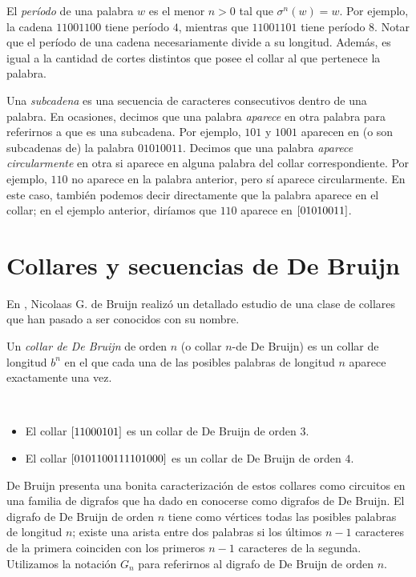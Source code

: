 El \emph{período} de una palabra $w$ es el menor $n > 0$ tal que
$\sigma^n(w) = w$. Por ejemplo, la cadena $11001100$ tiene período $4$,
mientras que $11001101$ tiene período $8$.
Notar que el período de una cadena necesariamente divide a su longitud.
Además, es igual a la cantidad de cortes distintos que posee el collar al que
pertenece la palabra.

Una \emph{subcadena} es una secuencia de caracteres consecutivos dentro de una
palabra. 
En ocasiones, decimos que una palabra \emph{aparece} en otra palabra
para referirnos a que es una subcadena. Por ejemplo, $101$ y $1001$ aparecen en
(o son subcadenas de) la palabra $01010011$. Decimos que una palabra
\emph{aparece circularmente} en otra si aparece en alguna palabra del collar
correspondiente. Por ejemplo, $110$ no aparece en la palabra anterior, pero sí
aparece circularmente. En este caso, también podemos decir directamente que
la palabra aparece en el collar; en el ejemplo anterior, diríamos que $110$
aparece en $\left[01010011\right]$.

\section{Collares y secuencias de De Bruijn}

En \cite{de-bruijn-combinatorial-problem}, Nicolaas G. de Bruijn realizó un
detallado estudio de una clase de collares que han pasado a ser conocidos con su
nombre.

\begin{definition}
	Un \emph{collar de De Bruijn} de orden $n$ (o collar $n$-de De Bruijn) es un collar
	de longitud $b^n$ en el que cada una de las posibles palabras de longitud $n$ 
	aparece exactamente una vez.
\end{definition}

\begin{examples}\ %
	\begin{itemize}
		\item El collar $\left[11000101\right]$ es un collar de De Bruijn de orden $3$.
		\item El collar $\left[0101100111101000\right]$ es un collar de De Bruijn de orden $4$.
	\end{itemize}
\end{examples}

De Bruijn presenta una bonita caracterización de estos collares como circuitos
en una familia de digrafos que ha dado en conocerse como digrafos de De Bruijn.
El digrafo de De Bruijn de orden $n$ tiene como vértices todas las posibles
palabras de longitud $n$; existe una arista entre dos palabras si los últimos
$n-1$ caracteres de la primera coinciden con los primeros $n-1$ caracteres de la
segunda. Utilizamos la notación $G_n$ para referirnos al digrafo de De Bruijn
de orden $n$.

